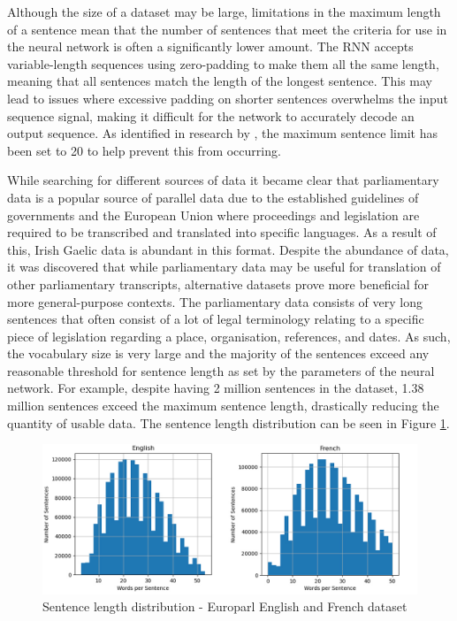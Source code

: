 Although the size of a dataset may be large, limitations in the maximum length of a sentence mean that the number of sentences that meet the criteria for use in the neural network is often a significantly lower amount. The RNN accepts variable-length sequences using zero-padding to make them all the same length, meaning that all sentences match the length of the longest sentence. This may lead to issues where excessive padding on shorter sentences overwhelms the input sequence signal, making it difficult for the network to accurately decode an output sequence. As identified in research by \cite{cho_properties_2014}, the maximum sentence limit has been set to 20 to help prevent this from occurring.

While searching for different sources of data it became clear that parliamentary data is a popular source of parallel data due to the established guidelines of governments and the European Union where proceedings and legislation are required to be transcribed and translated into specific languages. As a result of this, Irish Gaelic data is abundant in this format. Despite the abundance of data, it was discovered that while parliamentary data may be useful for translation of other parliamentary transcripts, alternative datasets prove more beneficial for more general-purpose contexts. The parliamentary data consists of very long sentences that often consist of a lot of legal terminology relating to a specific piece of legislation regarding a place, organisation, references, and dates. 
As such, the vocabulary size is very large and the majority of the sentences exceed any reasonable threshold for sentence length as set by the parameters of the neural network. For example, despite having 2 million sentences in the \cite{french_corpus_2005} dataset, 1.38 million sentences exceed the maximum sentence length, drastically reducing the quantity of usable data. The sentence length distribution can be seen in Figure \ref{fig:sentence_length-french_legal}.

\begin{figure}[ht!]
\centering
\includegraphics[width=1\textwidth]{media/methodology/s_length-1-en_fr.jpg}
\captionsetup{justification=centering}
\caption[Europarl dataset sentence length distribution]{Sentence length distribution - Europarl English and French dataset} %
\label{fig:sentence_length-french_legal}
\end{figure}

